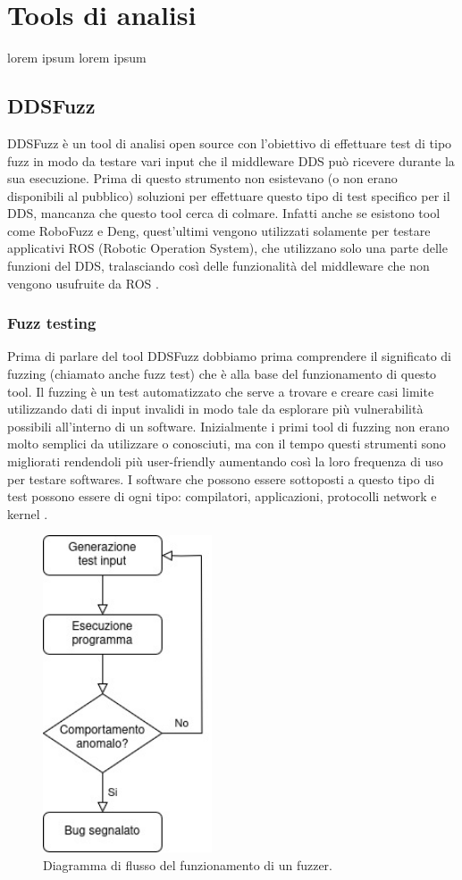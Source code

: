 \chapter{Tools di analisi}
lorem ipsum lorem ipsum
\section{DDSFuzz}
DDSFuzz è un tool di analisi open source con l'obiettivo di 
effettuare test di tipo fuzz
in modo da testare vari input che il middleware DDS può
ricevere durante la sua esecuzione. Prima di questo strumento 
non esistevano (o non erano disponibili al pubblico) soluzioni
per effettuare questo tipo di test specifico per il DDS, mancanza
che questo tool cerca di colmare. Infatti anche se esistono tool 
come RoboFuzz e Deng, quest'ultimi vengono utilizzati solamente
per testare applicativi ROS (Robotic Operation System), che 
utilizzano solo una parte delle funzioni del DDS, tralasciando
così delle funzionalità del middleware che non vengono usufruite
da ROS \cite{10.1145/3691620.3695073}.


\subsection{Fuzz testing}
Prima di parlare del tool DDSFuzz dobbiamo prima comprendere 
il significato di fuzzing (chiamato anche fuzz test) che è
alla base del funzionamento di questo tool. Il fuzzing è un test
automatizzato che serve a trovare e creare casi limite utilizzando
dati di input invalidi in modo tale da esplorare più vulnerabilità
possibili all'interno di un software. 
Inizialmente i primi tool di fuzzing non erano molto 
semplici da utilizzare o conosciuti, ma con il tempo questi strumenti
sono migliorati rendendoli più user-friendly aumentando così la 
loro frequenza di uso per testare softwares. I software che possono 
essere sottoposti a questo tipo di test possono essere 
di ogni tipo: compilatori, applicazioni, protocolli network 
e kernel \cite{8371326}.

\begin{figure}[H]
    \centering
    \includegraphics[width=5cm, keepaspectratio]{img/Diagramma di flusso fuzzer.jpg}
    \caption{Diagramma di flusso del funzionamento di un fuzzer.}
    \label{funzionamento fuzzer}
\end{figure}

